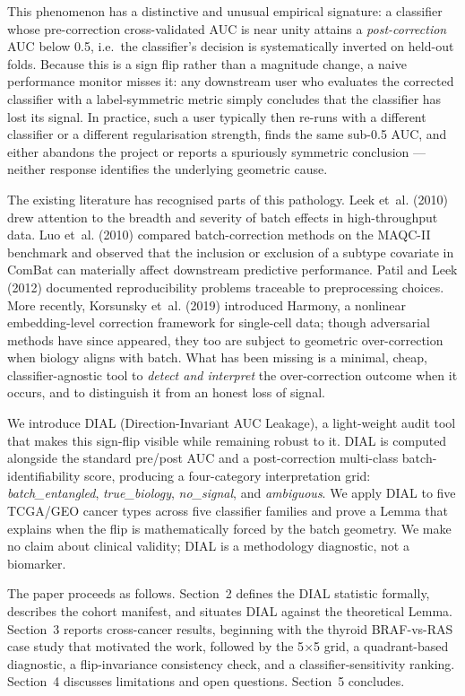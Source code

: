 \documentclass[11pt]{article}
\begin{document}
This phenomenon has a distinctive and unusual empirical signature: a classifier whose pre-correction cross-validated AUC is near unity attains a \emph{post-correction} AUC below 0.5, i.e.\ the classifier's decision is systematically inverted on held-out folds. Because this is a sign flip rather than a magnitude change, a naive performance monitor misses it: any downstream user who evaluates the corrected classifier with a label-symmetric metric simply concludes that the classifier has lost its signal. In practice, such a user typically then re-runs with a different classifier or a different regularisation strength, finds the same sub-0.5 AUC, and either abandons the project or reports a spuriously symmetric conclusion --- neither response identifies the underlying geometric cause.

The existing literature has recognised parts of this pathology. Leek et~al. (2010) drew attention to the breadth and severity of batch effects in high-throughput data. Luo et~al. (2010) compared batch-correction methods on the MAQC-II benchmark and observed that the inclusion or exclusion of a subtype covariate in ComBat can materially affect downstream predictive performance. Patil and Leek (2012) documented reproducibility problems traceable to preprocessing choices. More recently, Korsunsky et~al. (2019) introduced Harmony, a nonlinear embedding-level correction framework for single-cell data; though adversarial methods have since appeared, they too are subject to geometric over-correction when biology aligns with batch. What has been missing is a minimal, cheap, classifier-agnostic tool to \emph{detect and interpret} the over-correction outcome when it occurs, and to distinguish it from an honest loss of signal.

We introduce DIAL (Direction-Invariant AUC Leakage), a light-weight audit tool that makes this sign-flip visible while remaining robust to it. DIAL is computed alongside the standard pre/post AUC and a post-correction multi-class batch-identifiability score, producing a four-category interpretation grid: \emph{batch\_entangled}, \emph{true\_biology}, \emph{no\_signal}, and \emph{ambiguous}. We apply DIAL to five TCGA/GEO cancer types across five classifier families and prove a Lemma that explains when the flip is mathematically forced by the batch geometry. We make no claim about clinical validity; DIAL is a methodology diagnostic, not a biomarker.

The paper proceeds as follows. Section~2 defines the DIAL statistic formally, describes the cohort manifest, and situates DIAL against the theoretical Lemma. Section~3 reports cross-cancer results, beginning with the thyroid BRAF-vs-RAS case study that motivated the work, followed by the 5$\times$5 grid, a quadrant-based diagnostic, a flip-invariance consistency check, and a classifier-sensitivity ranking. Section~4 discusses limitations and open questions. Section~5 concludes.
\end{document}
